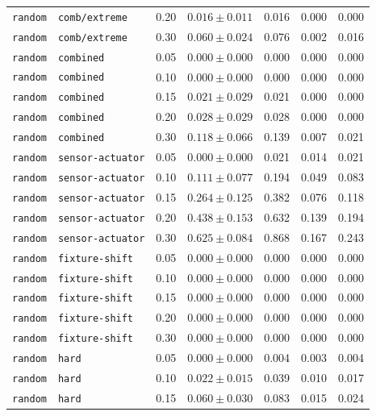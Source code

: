 \documentclass{article}
\begin{document}
\begin{center}
\begin{tabular}{lllcccc}
\texttt{random} & \texttt{comb/extreme} & 0.20 & $0.016 \pm 0.011$ & 0.016 & 0.000 & 0.000 \\
\texttt{random} & \texttt{comb/extreme} & 0.30 & $0.060 \pm 0.024$ & 0.076 & 0.002 & 0.016 \\
\texttt{random} & \texttt{combined} & 0.05 & $0.000 \pm 0.000$ & 0.000 & 0.000 & 0.000 \\
\texttt{random} & \texttt{combined} & 0.10 & $0.000 \pm 0.000$ & 0.000 & 0.000 & 0.000 \\
\texttt{random} & \texttt{combined} & 0.15 & $0.021 \pm 0.029$ & 0.021 & 0.000 & 0.000 \\
\texttt{random} & \texttt{combined} & 0.20 & $0.028 \pm 0.029$ & 0.028 & 0.000 & 0.000 \\
\texttt{random} & \texttt{combined} & 0.30 & $0.118 \pm 0.066$ & 0.139 & 0.007 & 0.021 \\
\texttt{random} & \texttt{sensor-actuator} & 0.05 & $0.000 \pm 0.000$ & 0.021 & 0.014 & 0.021 \\
\texttt{random} & \texttt{sensor-actuator} & 0.10 & $0.111 \pm 0.077$ & 0.194 & 0.049 & 0.083 \\
\texttt{random} & \texttt{sensor-actuator} & 0.15 & $0.264 \pm 0.125$ & 0.382 & 0.076 & 0.118 \\
\texttt{random} & \texttt{sensor-actuator} & 0.20 & $0.438 \pm 0.153$ & 0.632 & 0.139 & 0.194 \\
\texttt{random} & \texttt{sensor-actuator} & 0.30 & $0.625 \pm 0.084$ & 0.868 & 0.167 & 0.243 \\
\texttt{random} & \texttt{fixture-shift} & 0.05 & $0.000 \pm 0.000$ & 0.000 & 0.000 & 0.000 \\
\texttt{random} & \texttt{fixture-shift} & 0.10 & $0.000 \pm 0.000$ & 0.000 & 0.000 & 0.000 \\
\texttt{random} & \texttt{fixture-shift} & 0.15 & $0.000 \pm 0.000$ & 0.000 & 0.000 & 0.000 \\
\texttt{random} & \texttt{fixture-shift} & 0.20 & $0.000 \pm 0.000$ & 0.000 & 0.000 & 0.000 \\
\texttt{random} & \texttt{fixture-shift} & 0.30 & $0.000 \pm 0.000$ & 0.000 & 0.000 & 0.000 \\
\texttt{random} & \texttt{hard} & 0.05 & $0.000 \pm 0.000$ & 0.004 & 0.003 & 0.004 \\
\texttt{random} & \texttt{hard} & 0.10 & $0.022 \pm 0.015$ & 0.039 & 0.010 & 0.017 \\
\texttt{random} & \texttt{hard} & 0.15 & $0.060 \pm 0.030$ & 0.083 & 0.015 & 0.024 \\

\end{tabular}
\end{center}
\end{document}
